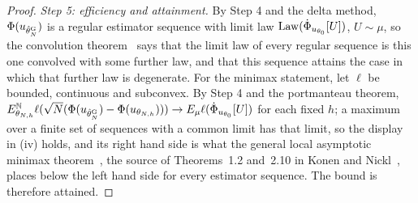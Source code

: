 \begin{proof}
\emph{Step 5: efficiency and attainment.} By Step 4 and the delta method, $\Phi(u_{\hat\theta^{\rm G}_N})$ is a regular estimator sequence with limit law $\operatorname{Law}(\dot\Phi_{u_{\theta_0}}[U])$, $U\sim\mu$, so the convolution theorem~\cite[Section~3.12]{vandervaartwellner2023} says that the limit law of every regular sequence is this one convolved with some further law, and that this sequence attains the case in which that further law is degenerate. For the minimax statement, let $\ell$ be bounded, continuous and subconvex. By Step 4 and the portmanteau theorem, $E^{\mathbb{N}}_{\theta_{N,h}}\ell(\sqrt N(\Phi(u_{\hat\theta^{\rm G}_N})-\Phi(u_{\theta_{N,h}})))\to E_\mu\ell(\dot\Phi_{u_{\theta_0}}[U])$ for each fixed $h$; a maximum over a finite set of sequences with a common limit has that limit, so the display in (iv) holds, and its right hand side is what the general local asymptotic minimax theorem~\cite[Section~3.12]{vandervaartwellner2023}, the source of Theorems~1.2 and~2.10 in Konen and Nickl~\cite{konennickl2026}, places below the left hand side for every estimator sequence. The bound is therefore attained.
\end{proof}

